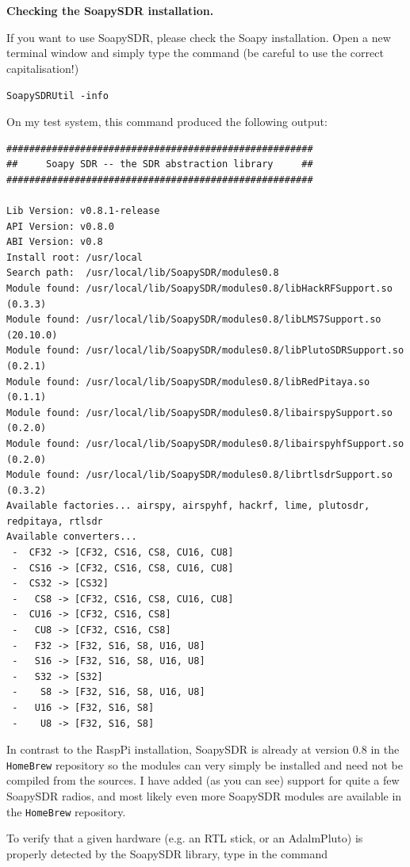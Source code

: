 \documentclass[12pt]{book}
\def\grtt#1{\texttt{\color{magenta}#1}}
\begin{document}
\clearpage
\textbf{Checking the SoapySDR installation.}

If you want to use SoapySDR, please check the Soapy installation.
Open a new terminal window and simply
type the command (be careful to use the correct capitalisation!)

\grtt{SoapySDRUtil -info}

On my test system, this command produced the following output:

\begin{tiny}
\begin{verbatim}
######################################################
##     Soapy SDR -- the SDR abstraction library     ##
######################################################

Lib Version: v0.8.1-release
API Version: v0.8.0
ABI Version: v0.8
Install root: /usr/local
Search path:  /usr/local/lib/SoapySDR/modules0.8
Module found: /usr/local/lib/SoapySDR/modules0.8/libHackRFSupport.so   (0.3.3)
Module found: /usr/local/lib/SoapySDR/modules0.8/libLMS7Support.so     (20.10.0)
Module found: /usr/local/lib/SoapySDR/modules0.8/libPlutoSDRSupport.so (0.2.1)
Module found: /usr/local/lib/SoapySDR/modules0.8/libRedPitaya.so       (0.1.1)
Module found: /usr/local/lib/SoapySDR/modules0.8/libairspySupport.so   (0.2.0)
Module found: /usr/local/lib/SoapySDR/modules0.8/libairspyhfSupport.so (0.2.0)
Module found: /usr/local/lib/SoapySDR/modules0.8/librtlsdrSupport.so   (0.3.2)
Available factories... airspy, airspyhf, hackrf, lime, plutosdr, redpitaya, rtlsdr
Available converters...
 -  CF32 -> [CF32, CS16, CS8, CU16, CU8]
 -  CS16 -> [CF32, CS16, CS8, CU16, CU8]
 -  CS32 -> [CS32]
 -   CS8 -> [CF32, CS16, CS8, CU16, CU8]
 -  CU16 -> [CF32, CS16, CS8]
 -   CU8 -> [CF32, CS16, CS8]
 -   F32 -> [F32, S16, S8, U16, U8]
 -   S16 -> [F32, S16, S8, U16, U8]
 -   S32 -> [S32]
 -    S8 -> [F32, S16, S8, U16, U8]
 -   U16 -> [F32, S16, S8]
 -    U8 -> [F32, S16, S8]
\end{verbatim}
\end{tiny}

In contrast to the RaspPi
installation, SoapySDR is already at version 0.8 in the \texttt{HomeBrew} repository so
the modules can very simply be installed and need not be compiled from the sources.
I have added (as you can see) support for quite a few SoapySDR radios, and most
likely even more SoapySDR modules are available in the \texttt{HomeBrew} repository.

\clearpage
To verify that a given hardware (e.g. an RTL stick, or an AdalmPluto) is properly detected by the
SoapySDR library, type in the command
\end{document}
